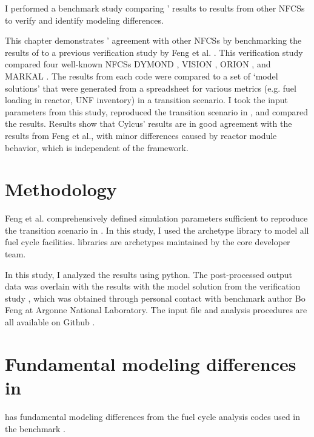 I performed a benchmark study comparing \Cyclus' results
to results from other \glspl{NFCS} to verify \Cyclus
and identify modeling differences.

This chapter demonstrates \Cyclus' agreement with other
\glspl{NFCS} by benchmarking the results of \Cyclus to
a previous verification study by Feng et al. \cite{feng_standardized_2016}.
This verification study compared four well-known \glspl{NFCS}
DYMOND \cite{yacout_modeling_2005},
VISION \cite{jacobson_verifiable_2010},
ORION \cite{gregg_analysis_2012}, and
MARKAL \cite{shay_epa_2006}. The results from each code were compared to a
set of `model solutions' that were generated from a spreadsheet
for various metrics (e.g. fuel loading in reactor, \gls{UNF} inventory)
in a transition scenario. I took the input parameters from this study,
reproduced the transition scenario in \Cyclus, and compared the results.
Results show that Cylcus' results are in good agreement with the results
from Feng et al., with minor differences caused by reactor module behavior,
which is independent of the framework.

\section{Methodology}

Feng et al. comprehensively defined simulation parameters
sufficient to reproduce the transition scenario in \Cyclus.
In this study, I used the \Cycamore \cite{huff_fundamental_2016}
archetype library to model
all fuel cycle facilities. \Cycamore libraries are
archetypes maintained by the core developer team.

In this study, I analyzed the \Cyclus results
using python. The post-processed
output data was overlain with the results with the
model solution from the verification study \cite{feng_standardized_2016},
which was obtained through personal contact with
benchmark author Bo Feng at Argonne National Laboratory.
The input file and analysis procedures are all available on Github \cite{bae_arfc/transition-scenarios:_2018}.



\section{Fundamental modeling differences in \Cyclus}

\Cyclus has fundamental modeling differences from the fuel cycle analysis codes
used in the benchmark \cite{feng_standardized_2016}.


